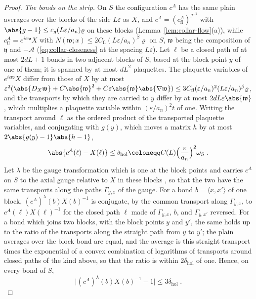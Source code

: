 \begin{proof}
\emph{The bonds on the strip.} On $S$ the configuration $c^A$ has the same plain averages over the blocks of the side $L\varepsilon$ as $X$, and $c^A = (c^A_{\mathrm{fl}})^{g^{-1}}$ with $\abs{g - 1} \leq c_g(L\varepsilon/a_n)\varrho$ on these blocks (Lemma~\ref{lem:collar-flow}(a)), while $c^A_{\mathrm{fl}} = e^{i\varepsilon\mathfrak w}X$ with $N(\mathfrak w; x) \leq 2C_{\mathrm{fl}}(L\varepsilon/a_n)^\beta\varrho$ on $S$, $\mathfrak w$ being the composition of $\mathfrak y$ and $-\mathcal A$ (\eqref{eq:collar-closeness} at the spacing $L\varepsilon$). Let $\ell$ be a closed path of at most $2dL + 1$ bonds in two adjacent blocks of $S$, based at the block point $y$ of one of them; it is spanned by at most $dL^2$ plaquettes. The plaquette variables of $e^{i\varepsilon\mathfrak w}X$ differ from those of $X$ by at most $\varepsilon^2(\abs{D_X\mathfrak w} + C\abs{\mathfrak w}^2 + C\varepsilon\abs{\mathfrak w}\abs{\nabla\mathfrak w}) \leq 3C_{\mathrm{fl}}(\varepsilon/a_n)^2(L\varepsilon/a_n)^\beta\varrho$, and the transports by which they are carried to $y$ differ by at most $2dL\varepsilon\abs{\mathfrak w}$, which multiplies a plaquette variable within $(\varepsilon/a_n)^2t$ of one. Writing the transport around $\ell$ as the ordered product of the transported plaquette variables, and conjugating with $g(y)$, which moves a matrix $h$ by at most $2\abs{g(y) - 1}\abs{h - 1}$,
\[
    \abs{c^A(\ell) - X(\ell)} \leq \delta_{\mathrm{hol}} \coloneqq C(L)\Bigl(\frac{\varepsilon}{a_n}\Bigr)^2\omega_S\;.
\]
Let $\lambda$ be the gauge transformation which is one at the block points and carries $c^A$ on $S$ to the axial gauge relative to $X$ in these blocks \cite[(1.19), p.~79]{BalabanREG}, so that the two have the same transports along the paths $\Gamma_{y,x}$ of the gauge. For a bond $b = \langle x, x'\rangle$ of one block, $(c^A)^\lambda(b)X(b)^{-1}$ is conjugate, by the common transport along $\Gamma_{y,x}$, to $c^A(\ell)X(\ell)^{-1}$ for the closed path $\ell$ made of $\Gamma_{y,x}$, $b$, and $\Gamma_{y,x'}$ reversed. For a bond which joins two blocks, with the block points $y$ and $y'$, the same holds up to the ratio of the transports along the straight path from $y$ to $y'$; the plain averages over the block bond are equal, and the average \cite[(0.4), p.~253]{BalabanRG1} is this straight transport times the exponential of a convex combination of logarithms of transports around closed paths of the kind above, so that the ratio is within $2\delta_{\mathrm{hol}}$ of one. Hence, on every bond of $S$,
\[
    \bigl\lvert(c^A)^\lambda(b)X(b)^{-1} - 1\bigr\rvert \leq 3\delta_{\mathrm{hol}}\;.
\]
\end{proof}
